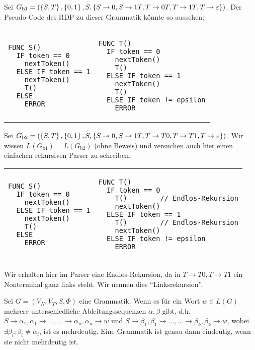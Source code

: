 \begin{bsp}
Sei $G_{\text{b1}}=(\left\{S,T\right\},\left\{0,1\right\},S,\left\{S \to 0,S \to 1T, T \to 0T, T \to 1T, T \to \varepsilon\right\})$.
Der Pseudo-Code des RDP zu dieser Grammatik könnte so aussehen:

\begin{tabular}{p{0.47\hsize}p{0.47\hsize}}
\begin{verbatim}
FUNC S()
  IF token == 0
    nextToken()
  ELSE IF token == 1
    nextToken()
    T()
  ELSE
    ERROR
\end{verbatim}
&
\begin{verbatim}
FUNC T()
  IF token == 0
    nextToken()
    T()
  ELSE IF token == 1
    nextToken()
    T()
  ELSE IF token != epsilon
    ERROR  
\end{verbatim}
\end{tabular}
\end{bsp}

\begin{bsp}
Sei $G_{\text{b2}}=\left(\left\{S,T\right\},\left\{0,1\right\},S,\left\{S \to 0, S \to 1T, T \to T0, T \to T1, T \to \varepsilon\right\}\right)$.
Wir wissen $L(G_{\text{b1}})=L(G_{\text{b2}})$ (ohne Beweis) und versuchen auch hier einen einfachen rekursiven Parser zu schreiben.

\begin{tabular}{p{0.47\hsize}p{0.47\hsize}}
\begin{verbatim}
FUNC S()
  IF token == 0
    nextToken()
  ELSE IF token == 1
    nextToken()
    T()
  ELSE
    ERROR
\end{verbatim}
&
\begin{verbatim}
FUNC T()
  IF token == 0
    T()        // Endlos-Rekursion
    nextToken()
  ELSE IF token == 1
    T()        // Endlos-Rekursion
    nextToken()
  ELSE IF token != epsilon
    ERROR  
\end{verbatim}
\end{tabular}
\vspace{-0.3cm}

Wir erhalten hier im Parser eine Endlos-Rekursion, da in $T \to T0, T \to T1$ ein Nonterminal ganz links steht. Wir nennen dies ``Linksrekursion''.
\end{bsp}

\begin{defn}
Sei $G=(V_N,V_T,S,\Phi)$ eine Grammatik. Wenn es für ein Wort $w \in L(G)$ mehrere
unterschiedliche Ableitungssequenzen $\alpha,\beta$ gibt, d.h. $S \to \alpha_1, \alpha_1 \to \ldots, \ldots \to \alpha_n, \alpha_n \to w$ und $S \to \beta_1, \beta_1 \to \ldots, \ldots \to \beta_k, \beta_k \to w$,
wobei $\exists \beta_i : \beta_i \neq \alpha_i$, ist es mehrdeutig. Eine Grammatik ist genau dann eindeutig, wenn sie nicht mehrdeutig ist.
\end{defn}

